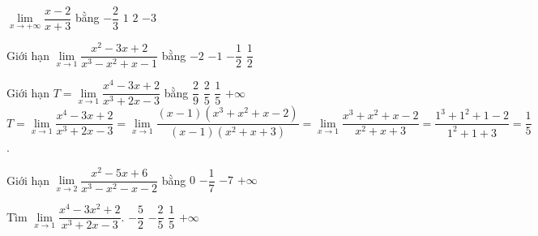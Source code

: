 \begin{ex}%
	 $\lim\limits_{x\to +\infty } \dfrac {x-2}{x+3}$ bằng
	 \choice
	 {$-\dfrac {2}{3}$}
	 {\True $1$}
	 {$2$}
	 {$-3$}
\end{ex}
\begin{ex}%
	 Giới hạn $\lim\limits_{x\to 1} \dfrac {x^2-3x+2}{x^3-x^2+x-1}$ bằng
	 \choice
	 {$-2$}
	 {$-1$}
	 {\True $-\dfrac {1}{2}$}
	 {$\dfrac {1}{2}$}
\end{ex}
\begin{ex}%
	 Giới hạn $T=\lim\limits_{x\to 1} \dfrac {x^4-3x+2}{x^3+2x-3}$ bằng
	 \choice
	 {$\dfrac {2}{9}$}
	 {$\dfrac {2}{5}$}
	 {\True $\dfrac {1}{5}$}
	 {$+\infty $}
	 \loigiai
	 {$T=\lim\limits_{x\to 1} \dfrac {x^4-3x+2}{x^3+2x-3}=\lim\limits_{x\to 1} \dfrac {(x-1)\left(x^3+x^2+x-2\right)}{(x-1)\left(x^2+x+3 \right)}=\lim\limits_{x\to 1} \dfrac {x^3+x^2+x-2}{x^2+x+3}=\dfrac {1^3+1^2+1-2}{1^2+1+3}=\dfrac {1}{5}$.
	 }
\end{ex}
\begin{ex}%
	Giới hạn $\lim\limits_{x\to 2} \dfrac {x^2-5x+6}{x^3-x^2-x-2}$ bằng
	\choice
	{$0$}
	{\True $-\dfrac {1}{7}$}
	{$-7$}
	{$+\infty $}
\end{ex}
\begin{ex}%
	Tìm $\lim\limits_{x\to 1} \dfrac {x^4-3x^2+2}{x^3+2x-3}$.
	\choice
	{$-\dfrac {5}{2}$}
	{\True $-\dfrac {2}{5}$}
	{$\dfrac {1}{5}$}
	{$+\infty $}
\end{ex}
